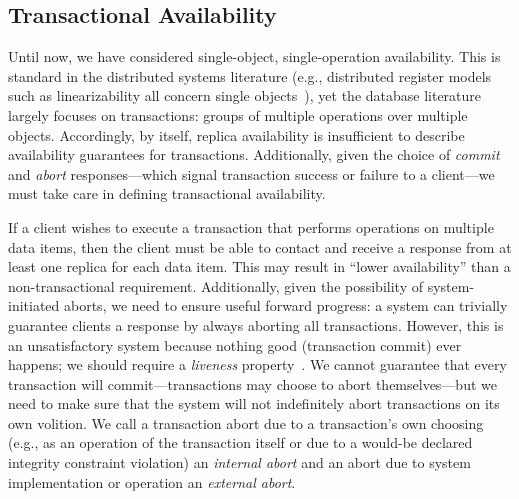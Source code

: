 

\subsection{Transactional Availability}

Until now, we have considered single-object, single-operation
availability. This is standard in the distributed systems literature
(e.g., distributed register models such as linearizability all concern
single objects~\cite{herlihy-art}), yet the database literature
largely focuses on transactions: groups of multiple operations over
multiple objects. Accordingly, by itself, replica availability is
insufficient to describe availability guarantees for
transactions. Additionally, given the choice of \textit{commit} and
\textit{abort} responses---which signal transaction success or failure
to a client---we must take care in defining transactional
availability.

If a client wishes to execute a transaction that performs operations
on multiple data items, then the client must be able to contact and
receive a response from at least one replica for each data item. This
may result in ``lower availability'' than a non-transactional
requirement. Additionally, given the possibility of system-initiated
aborts, we need to ensure useful forward progress: a system can
trivially guarantee clients a response by always aborting all
transactions. However, this is an unsatisfactory system because
nothing good (transaction commit) ever happens; we should require a
\textit{liveness} property~\cite{transaction-liveness}. We cannot
guarantee that every transaction will commit---transactions may choose
to abort themselves---but we need to make sure that the system will
not indefinitely abort transactions on its own volition. We call a
transaction abort due to a transaction's own choosing (e.g., as an
operation of the transaction itself or due to a would-be declared
integrity constraint violation) an \textit{internal abort} and an
abort due to system implementation or operation an \textit{external abort}.

